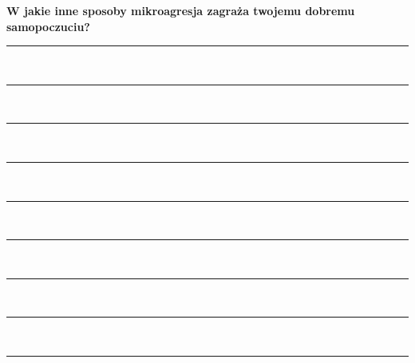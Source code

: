\newpage
\noindent
\textcolor{ProcessBlue}{\textbf{\Large{W jakie inne sposoby mikroagresja zagraża twojemu dobremu samopoczuciu?}}}\\
\noindent\rule{\textwidth}{1pt}\\
\noindent\rule{\textwidth}{1pt}\\
\noindent\rule{\textwidth}{1pt}\\
\noindent\rule{\textwidth}{1pt}\\
\noindent\rule{\textwidth}{1pt}\\
\noindent\rule{\textwidth}{1pt}\\
\noindent\rule{\textwidth}{1pt}\\
\noindent\rule{\textwidth}{1pt}\\
\noindent\rule{\textwidth}{1pt}\\\\

